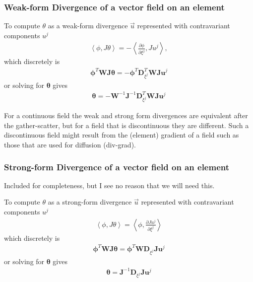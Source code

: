 \documentclass{report}
\newcommand{\inner}[2]{ \left\langle #1, #2 \right\rangle }
\newcommand{\mat}[1]{\boldsymbol #1}
\newcommand{\dvec}[1]{\boldsymbol #1}
\begin{document}
\subsubsection*{Weak-form Divergence of a vector field on an element}
To compute $\theta$ as a weak-form divergence $\vec{u}$ represented with contravariant components $u^j$
\begin{align}
   \inner{\phi}{J \theta}
   =
   -\inner{\frac{\partial \phi}{\partial \xi^j}}{Ju^j},
\end{align}
which discretely is
\begin{align}
   \dvec{\phi}^{T} \mat{W} \mat{J} \dvec{\theta}
   =
   -\dvec{\phi}^{T} \mat{D}_{\xi^j}^{T} \mat{W} \mat{J} \dvec{u^{j}}
\end{align}
or solving for $\dvec{\theta}$ gives
\begin{align}
   \dvec{\theta}
   =
   -\mat{W}^{-1} \mat{J}^{-1} \mat{D}_{\xi^j}^{T} \mat{W} \mat{J} \dvec{u^{j}}
\end{align}

For a continuous field the weak and strong form divergences are equivalent after the gather-scatter,
but for a field that is discontinuous they are different.
Such a discontinuous field might result from the (element) gradient of a field such as those that are used
for diffusion (div-grad).

\subsubsection*{Strong-form Divergence of a vector field on an element}
Included for completeness, but I see no reason that we will need this.

To compute $\theta$ as a strong-form divergence $\vec{u}$ represented with contravariant components $u^j$
\begin{align}
   \inner{\phi}{J\theta}
   =
   \inner{\phi}{\frac{\partial Ju^j}{\partial \xi^j}}
\end{align}
which discretely is
\begin{align}
   \dvec{\phi}^{T} \mat{W} \mat{J} \dvec{\theta}
   =
   \dvec{\phi}^{T} \mat{W} \mat{D}_{\xi^j} \mat{J} \dvec{u^{j}}
\end{align}
or solving for $\dvec{\theta}$ gives
\begin{align}
   \dvec{\theta}
   =
   \mat{J}^{-1} \mat{D}_{\xi^j} \mat{J} \dvec{u^{j}}
\end{align}
\end{document}
